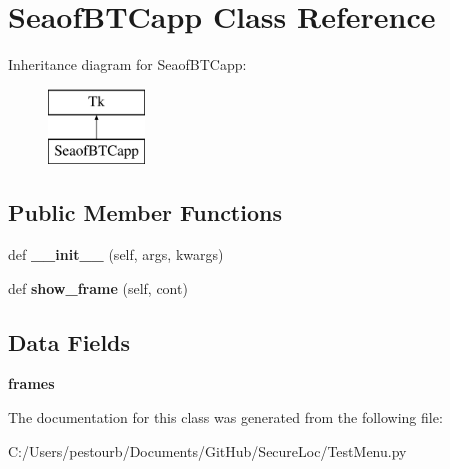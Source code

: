 \hypertarget{class_test_menu_1_1_seaof_b_t_capp}{}\section{Seaof\+B\+T\+Capp Class Reference}
\label{class_test_menu_1_1_seaof_b_t_capp}
Inheritance diagram for Seaof\+B\+T\+Capp\+:\begin{figure}[H]
\begin{center}
\leavevmode
\includegraphics[height=2.000000cm]{class_test_menu_1_1_seaof_b_t_capp}
\end{center}
\end{figure}
\subsection*{Public Member Functions}
\begin{DoxyCompactItemize}
\item 
\mbox{\label{class_test_menu_1_1_seaof_b_t_capp_a302afe6819b093163cc8ea6f029c75da}} 
def {\bfseries \+\_\+\+\_\+init\+\_\+\+\_\+} (self, args, kwargs)
\item 
\mbox{\label{class_test_menu_1_1_seaof_b_t_capp_a590a388f6cd3c8fe0aa4ec4151c324a3}} 
def {\bfseries show\+\_\+frame} (self, cont)
\end{DoxyCompactItemize}
\subsection*{Data Fields}
\begin{DoxyCompactItemize}
\item 
\mbox{\label{class_test_menu_1_1_seaof_b_t_capp_a76a412a38642b618caf4a30f4cd2703c}} 
{\bfseries frames}
\end{DoxyCompactItemize}


The documentation for this class was generated from the following file\+:\begin{DoxyCompactItemize}
\item 
C\+:/\+Users/pestourb/\+Documents/\+Git\+Hub/\+Secure\+Loc/Test\+Menu.\+py\end{DoxyCompactItemize}
